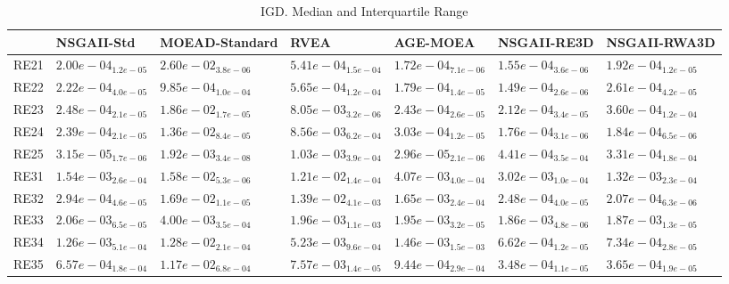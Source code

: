 \documentclass{article}
\begin{document}
\begin{table}
\caption{IGD. Median and Interquartile Range}
\label{table: IGD}
\centering
\begin{scriptsize}
\begin{tabular}{lllllll}
\hline & NSGAII-Std & MOEAD-Standard & RVEA & AGE-MOEA & NSGAII-RE3D &  NSGAII-RWA3D\\
\hline 
RE21 & $  2.00e-04_{ 1.2e-05}$ & $  2.60e-02_{ 3.8e-06}$ & $  5.41e-04_{ 1.5e-04}$ & \cellcolor{gray25}$  1.72e-04_{ 7.1e-06}$ & \cellcolor{gray95}$  1.55e-04_{ 3.6e-06}$ & $  1.92e-04_{ 1.2e-05}$ \\
RE22 & $  2.22e-04_{ 4.0e-05}$ & $  9.85e-04_{ 1.0e-04}$ & $  5.65e-04_{ 1.2e-04}$ & \cellcolor{gray25}$  1.79e-04_{ 1.4e-05}$ & \cellcolor{gray95}$  1.49e-04_{ 2.6e-06}$ & $  2.61e-04_{ 4.2e-05}$ \\
RE23 & $  2.48e-04_{ 2.1e-05}$ & $  1.86e-02_{ 1.7e-05}$ & $  8.05e-03_{ 3.2e-06}$ & \cellcolor{gray25}$  2.43e-04_{ 2.6e-05}$ & \cellcolor{gray95}$  2.12e-04_{ 3.4e-05}$ & $  3.60e-04_{ 1.2e-04}$ \\
RE24 & $  2.39e-04_{ 2.1e-05}$ & $  1.36e-02_{ 8.4e-05}$ & $  8.56e-03_{ 6.2e-04}$ & $  3.03e-04_{ 1.2e-05}$ & \cellcolor{gray95}$  1.76e-04_{ 3.1e-06}$ & \cellcolor{gray25}$  1.84e-04_{ 6.5e-06}$ \\
RE25 & \cellcolor{gray25}$  3.15e-05_{ 1.7e-06}$ & $  1.92e-03_{ 3.4e-08}$ & $  1.03e-03_{ 3.9e-04}$ & \cellcolor{gray95}$  2.96e-05_{ 2.1e-06}$ & $  4.41e-04_{ 3.5e-04}$ & $  3.31e-04_{ 1.8e-04}$ \\
RE31 & \cellcolor{gray25}$  1.54e-03_{ 2.6e-04}$ & $  1.58e-02_{ 5.3e-06}$ & $  1.21e-02_{ 1.4e-04}$ & $  4.07e-03_{ 4.0e-04}$ & $  3.02e-03_{ 1.0e-04}$ & \cellcolor{gray95}$  1.32e-03_{ 2.3e-04}$ \\
RE32 & $  2.94e-04_{ 4.6e-05}$ & $  1.69e-02_{ 1.1e-05}$ & $  1.39e-02_{ 4.1e-03}$ & $  1.65e-03_{ 2.4e-04}$ & \cellcolor{gray25}$  2.48e-04_{ 4.0e-05}$ & \cellcolor{gray95}$  2.07e-04_{ 6.3e-06}$ \\
RE33 & $  2.06e-03_{ 6.5e-05}$ & $  4.00e-03_{ 3.5e-04}$ & $  1.96e-03_{ 1.1e-03}$ & $  1.95e-03_{ 3.2e-05}$ & \cellcolor{gray95}$  1.86e-03_{ 4.8e-06}$ & \cellcolor{gray25}$  1.87e-03_{ 1.3e-05}$ \\
RE34 & $  1.26e-03_{ 5.1e-04}$ & $  1.28e-02_{ 2.1e-04}$ & $  5.23e-03_{ 9.6e-04}$ & $  1.46e-03_{ 1.5e-03}$ & \cellcolor{gray95}$  6.62e-04_{ 1.2e-05}$ & \cellcolor{gray25}$  7.34e-04_{ 2.8e-05}$ \\
RE35 & $  6.57e-04_{ 1.8e-04}$ & $  1.17e-02_{ 6.8e-04}$ & $  7.57e-03_{ 1.4e-05}$ & $  9.44e-04_{ 2.9e-04}$ & \cellcolor{gray95}$  3.48e-04_{ 1.1e-05}$ & \cellcolor{gray25}$  3.65e-04_{ 1.9e-05}$ \\

\end{tabular}
\end{scriptsize}
\end{table}
\end{document}
